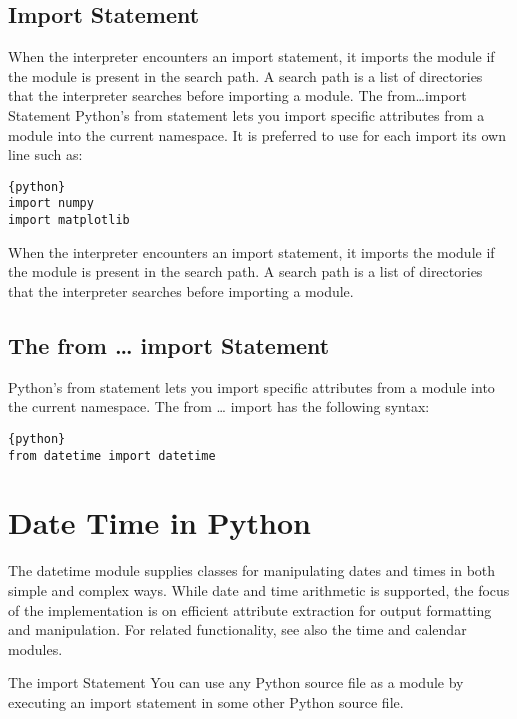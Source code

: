 \subsection{Import Statement}\label{import-statement}

When the interpreter encounters an import statement, it imports the
module if the module is present in the search path. A search path is a
list of directories that the interpreter searches before importing a
module. The from\ldots{}import Statement Python's from statement lets
you import specific attributes from a module into the current namespace.
It is preferred to use for each import its own line such as:

\begin{lstlisting}{python}
import numpy
import matplotlib
\end{lstlisting}

When the interpreter encounters an import statement, it imports the
module if the module is present in the search path. A search path is a
list of directories that the interpreter searches before importing a
module.

\subsection{The from \ldots{} import
Statement}\label{the-from-import-statement}

Python's from statement lets you import specific attributes from a
module into the current namespace. The from \ldots{} import has the
following syntax:

\begin{lstlisting}{python}
from datetime import datetime   
\end{lstlisting}

\section{Date Time in Python}\label{date-time-in-python}

The datetime module supplies classes for manipulating dates and times in
both simple and complex ways. While date and time arithmetic is
supported, the focus of the implementation is on efficient attribute
extraction for output formatting and manipulation. For related
functionality, see also the time and calendar modules.

The import Statement You can use any Python source file as a module by
executing an import statement in some other Python source file.

